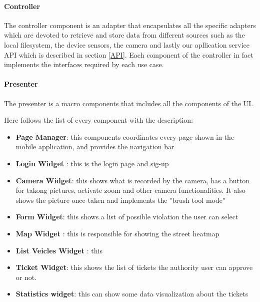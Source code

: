 \paragraph{Controller}

The controller component is an adapter that encapsulates all the specific adapters which are devoted to retrieve and store data from different sources such as the local filesystem, the device sensors, the camera and lastly our apllication service API which is described in section \ref{API}.
Each component of the controller in fact implements the interfaces required by each use case.


\paragraph{Presenter}
The presenter is a macro components that includes all the components of the UI.

Here follows the list of every component with the description:
\begin{itemize}ù
  \item \textbf{Page Manager}: this components coordinates every page shown in the mobile application, and provides the navigation bar
  \item \textbf{Login Widget} : this is the login page and sig-up
  \item \textbf{Camera Widget}: this shows what is recorded by the camera, has a button for takong pictures, activate zoom and other camera functionalities. It also shows the picture once taken and implements the "brush tool mode"
  \item \textbf{Form Widget}: this shows a list of possible violation the user can select
  \item \textbf{Map Widget} : this is responsible for showing the street heatmap
  \item \textbf{List Veicles Widget} : this
  \item \textbf{Ticket Widget}: this shows the list of tickets the authority user can approve or not.
  \item \textbf{Statistics widget}: this can show some data visualization about the tickets
\end{itemize}





